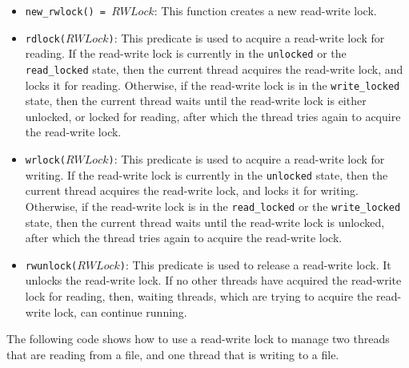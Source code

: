 \begin{itemize}
\item \texttt{new\_rwlock() = $RWLock$}: This function creates a new read-write lock.
\item \texttt{rdlock($RWLock$)}: This predicate is used to acquire a read-write lock for reading.  If the read-write lock is currently in the \texttt{unlocked} or the \texttt{read\_locked} state, then the current thread acquires the read-write lock, and locks it for reading.  Otherwise, if the read-write lock is in the \texttt{write\_locked} state, then the current thread waits until the read-write lock is either unlocked, or locked for reading, after which the thread tries again to acquire the read-write lock.
\item \texttt{wrlock($RWLock$)}: This predicate is used to acquire a read-write lock for writing.  If the read-write lock is currently in the \texttt{unlocked} state, then the current thread acquires the read-write lock, and locks it for writing.  Otherwise, if the read-write lock is in the \texttt{read\_locked} or the \texttt{write\_locked} state, then the current thread waits until the read-write lock is unlocked, after which the thread tries again to acquire the read-write lock.
\item \texttt{rwunlock($RWLock$)}: This predicate is used to release a read-write lock.  It unlocks the read-write lock.  If no other threads have acquired the read-write lock for reading, then, waiting threads, which are trying to acquire the read-write lock, can continue running.
\end{itemize}

The following code shows how to use a read-write lock to manage two threads that are reading from a file, and one thread that is writing to a file.

